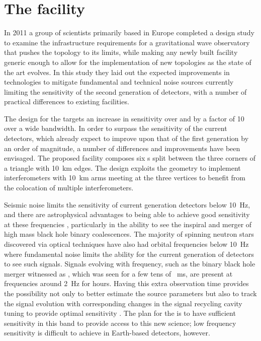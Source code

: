 \section{The \ET{} facility}
In 2011 a group of scientists primarily based in Europe completed a design study \cite{ET2011} to examine the infrastructure requirements for a gravitational wave observatory that pushes the \MI{} topology to its limits, while making any newly built facility generic enough to allow for the implementation of new topologies as the state of the art evolves. In this study they laid out the expected improvements in technologies to mitigate fundamental and technical noise sources currently limiting the sensitivity of the second generation of detectors, with a number of practical differences to existing facilities.

The design for the \ET{} targets an increase in sensitivity over \ALIGO{} and \AVIRGO{} by a factor of \num{10} over a wide bandwidth. In order to surpass the sensitivity of the current detectors, which already expect to improve upon that of the first generation by an order of magnitude, a number of differences and improvements have been envisaged. The proposed \ET{} facility composes six \DRFPMI{}s split between the three corners of a triangle with \SI{10}{\kilo\meter} edges. The design exploits the geometry to implement interferometers with \SI{10}{\kilo\meter} arms meeting at the three vertices to benefit from the colocation of multiple interferometers.

Seismic noise limits the sensitivity of current generation detectors below \SI{10}{\hertz}, and there are astrophysical advantages to being able to achieve good sensitivity at these frequencies \cite{Sathyaprakash2012}, particularly in the ability to see the inspiral and merger of high mass black hole binary coalescences. The majority of spinning neutron stars discovered via optical techniques have also had orbital frequencies below \SI{10}{\hertz} where fundamental noise limits the ability for the current generation of detectors to see such signals. Signals evolving with frequency, such as the binary black hole merger witnessed as \GWFIRSTEVENT{} \cite{Abbott2016}, which was seen for a few tens of \SI{}{\milli\second}, are present at frequencies around \SI{2}{\hertz} for hours. Having this extra observation time provides the possibility not only to better estimate the source parameters but also to track the signal evolution with corresponding changes in the signal recycling cavity tuning to provide optimal sensitivity \cite{Heinzel2002, Simakov2014}. The plan for the \ET{} is to have sufficient sensitivity in this band to provide access to this new science; low frequency sensitivity is difficult to achieve in Earth-based detectors, however.

